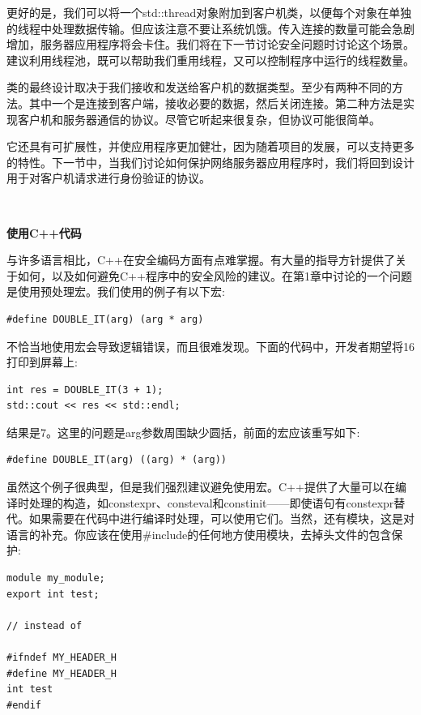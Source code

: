更好的是，我们可以将一个std::thread对象附加到客户机类，以便每个对象在单独的线程中处理数据传输。但应该注意不要让系统饥饿。传入连接的数量可能会急剧增加，服务器应用程序将会卡住。我们将在下一节讨论安全问题时讨论这个场景。建议利用线程池，既可以帮助我们重用线程，又可以控制程序中运行的线程数量。 \par
类的最终设计取决于我们接收和发送给客户机的数据类型。至少有两种不同的方法。其中一个是连接到客户端，接收必要的数据，然后关闭连接。第二种方法是实现客户机和服务器通信的协议。尽管它听起来很复杂，但协议可能很简单。 \par
它还具有可扩展性，并使应用程序更加健壮，因为随着项目的发展，可以支持更多的特性。下一节中，当我们讨论如何保护网络服务器应用程序时，我们将回到设计用于对客户机请求进行身份验证的协议。 \par

\noindent\textbf{}\ \par
\textbf{使用C++代码} \ \par
与许多语言相比，C++在安全编码方面有点难掌握。有大量的指导方针提供了关于如何，以及如何避免C++程序中的安全风险的建议。在第1章中讨论的一个问题是使用预处理宏。我们使用的例子有以下宏: \par

\begin{lstlisting}[caption={}]
#define DOUBLE_IT(arg) (arg * arg)
\end{lstlisting}

不恰当地使用宏会导致逻辑错误，而且很难发现。下面的代码中，开发者期望将16打印到屏幕上: \par

\begin{lstlisting}[caption={}]
int res = DOUBLE_IT(3 + 1);
std::cout << res << std::endl;
\end{lstlisting}

结果是7。这里的问题是arg参数周围缺少圆括，前面的宏应该重写如下: \par

\begin{lstlisting}[caption={}]
#define DOUBLE_IT(arg) ((arg) * (arg))
\end{lstlisting}

虽然这个例子很典型，但是我们强烈建议避免使用宏。C++提供了大量可以在编译时处理的构造，如constexpr、consteval和constinit——即使语句有constexpr替代。如果需要在代码中进行编译时处理，可以使用它们。当然，还有模块，这是对语言的补充。你应该在使用\#include的任何地方使用模块，去掉头文件的包含保护: \par

\begin{lstlisting}[caption={}]
module my_module;
export int test;

// instead of

#ifndef MY_HEADER_H
#define MY_HEADER_H
int test
#endif
\end{lstlisting}

